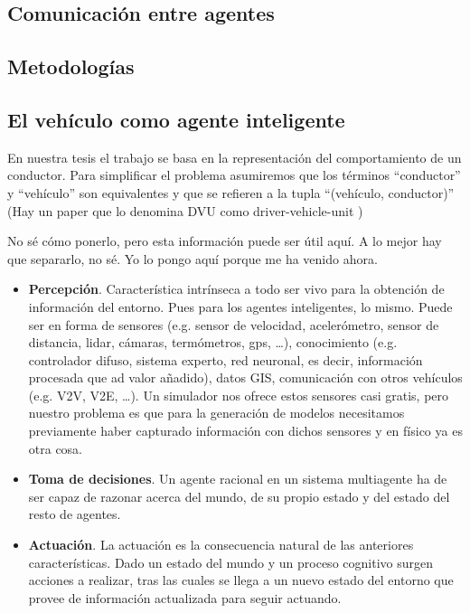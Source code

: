 \subsection{Comunicación entre agentes}

\subsection{Metodologías}

\subsection{El vehículo como agente inteligente}

En nuestra tesis el trabajo se basa en la representación del comportamiento de un conductor. Para simplificar el problema asumiremos que los términos \enquote{conductor} y \enquote{vehículo} son equivalentes y que se refieren a la tupla \enquote{(vehículo, conductor)} (Hay un paper que lo denomina DVU como driver-vehicle-unit \cite{Dia2002})

No sé cómo ponerlo, pero esta información puede ser útil aquí. A lo mejor hay que separarlo, no sé. Yo lo pongo aquí porque me ha venido ahora.

\begin{itemize}
	\item \textbf{Percepción}. Característica intrínseca a todo ser vivo para la obtención de información del entorno. Pues para los agentes inteligentes, lo mismo. Puede ser en forma de sensores (e.g. sensor de velocidad, acelerómetro, sensor de distancia, lidar, cámaras, termómetros, gps, \ldots), conocimiento (e.g. controlador difuso, sistema experto, red neuronal, es decir, información procesada que ad valor añadido), datos GIS, comunicación con otros vehículos (e.g. V2V, V2E, \ldots). Un simulador nos ofrece estos sensores casi gratis, pero nuestro problema es que para la generación de modelos necesitamos previamente haber capturado información con dichos sensores y en físico ya es otra cosa.
	\item \textbf{Toma de decisiones}. Un agente racional en un sistema multiagente ha de ser capaz de razonar acerca del mundo, de su propio estado y del estado del resto de agentes.
	\item \textbf{Actuación}. La actuación es la consecuencia natural de las anteriores características. Dado un estado del mundo y un proceso cognitivo surgen acciones a realizar, tras las cuales se llega a un nuevo estado del entorno que provee de información actualizada para seguir actuando.
\end{itemize}

